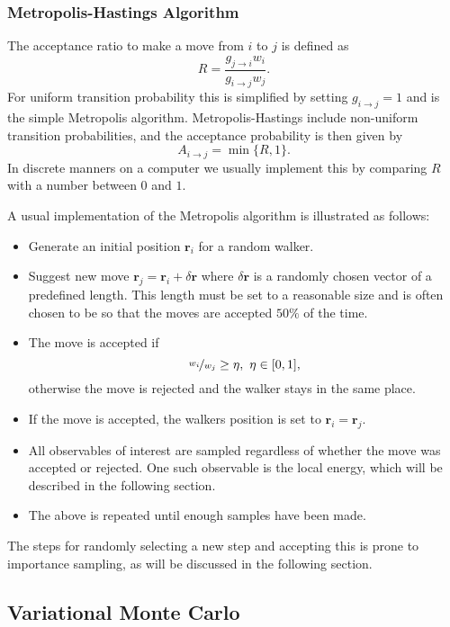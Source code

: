 \documentclass[aps,prb,twocolumn,floatfix]{revtex4}
\renewcommand{\vec}{\mathbf}
\begin{document}
\subsubsection{Metropolis-Hastings Algorithm}

The acceptance ratio to make a move from $i$ to $j$ is defined as
\begin{equation}
    R = \frac{g_{j \to i} w_i}{g_{i \to j} w_j}.
\end{equation}
For uniform transition probability this is simplified by setting $g_{i \to j} = 1$ and is the simple Metropolis algorithm. Metropolis-Hastings include non-uniform transition probabilities, and the acceptance probability is then given by
\begin{equation}
    A_{i \to j} = \min \{ R, 1 \}.
\end{equation}
In discrete manners on a computer we usually implement this by comparing $R$ with a number between $0$ and $1$.

A usual implementation of the Metropolis algorithm is illustrated as follows:
\begin{itemize}
\item Generate an initial position $\vec r_i$ for a random walker.
\item Suggest new move $\vec r_j = \vec r_i + \delta\vec r$ where $\delta\vec r$ is a randomly chosen vector of a predefined length. This length must be set to a reasonable size and is often chosen to be so that the moves are accepted $50 \%$ of the time.
\item The move is accepted if
\begin{equation}
\nicefrac{w_i}{w_j} \geq \eta, ~\eta \in [0,1],
\end{equation} 
otherwise the move is rejected and the walker stays in the same place.
\item If the move is accepted, the walkers position is set to $\vec r_i = \vec r_j$.
\item All observables of interest are sampled regardless of whether the move was accepted or rejected. One such observable is the local energy, which will be described in the following section.
\item The above is repeated until enough samples have been made.
\end{itemize}
The steps for randomly selecting a new step and accepting this is prone to importance sampling, as will be discussed in the following section.

\subsection{Variational Monte Carlo} \label{sec:vmc}
\end{document}
